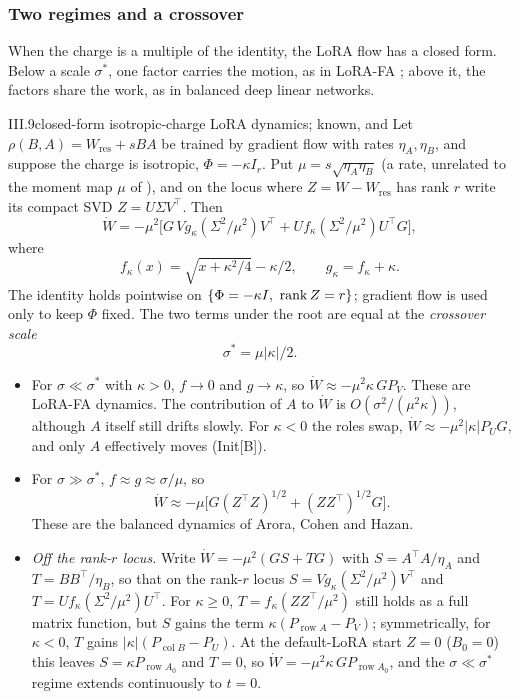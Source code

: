 
\subsubsection{Two regimes and a crossover}\label{sec:fibres-crossover}

When the charge is a multiple of the identity, the LoRA flow has a closed form. Below a scale $\sigma^*$, one factor
carries the motion, as in LoRA-FA \citep{zhang2023lora}; above it, the factors share the work, as in balanced deep
linear networks.

\begin{theorem}{III.9}{closed-form isotropic-charge LoRA dynamics; known, \citet{xtarmoun2021understanding} and \citet{xmin2021explicit}}
Let $\rho(B,A)=W_{\mathrm{res}}+sBA$ be trained by gradient flow with rates $\eta_A,\eta_B$, and suppose the charge is
isotropic, $\Phi=-\kappa I_r$. Put $\mu=s\sqrt{\eta_A\eta_B}$ (a rate, unrelated to the moment map $\mu$ of
), and on the locus where $Z=W-W_{\mathrm{res}}$ has rank $r$ write its compact SVD
$Z=U\Sigma V^\top$. Then
\[\dot W=-\mu^2\big[G\,V g_\kappa(\Sigma^2/\mu^2)V^\top+U f_\kappa(\Sigma^2/\mu^2)U^\top G\big],\]
where
\[f_\kappa(x)=\sqrt{x+\kappa^2/4}-\kappa/2,\qquad g_\kappa=f_\kappa+\kappa .\]
The identity holds pointwise on $\{\Phi=-\kappa I,\ \operatorname{rank} Z=r\}$; gradient flow is used only to keep $\Phi$ fixed. The
two terms under the root are equal at the \emph{crossover scale}
\[\sigma^*=\mu\lvert\kappa\rvert/2.\]
\begin{itemize}
\item For $\sigma\ll\sigma^*$ with $\kappa>0$, $f\to0$ and $g\to\kappa$, so $\dot W\approx-\mu^2\kappa\,GP_V$. These
  are LoRA-FA dynamics. The contribution of $A$ to $\dot W$ is $O(\sigma^2/(\mu^2\kappa))$, although $A$ itself still
  drifts slowly. For $\kappa<0$ the roles swap, $\dot W\approx-\mu^2\lvert\kappa\rvert P_UG$, and only $A$ effectively
  moves (Init[B]).
\item For $\sigma\gg\sigma^*$, $f\approx g\approx\sigma/\mu$, so
  \[\dot W\approx-\mu\big[G(Z^\top Z)^{1/2}+(ZZ^\top)^{1/2}G\big].\]
  These are the balanced dynamics of Arora, Cohen and Hazan.
\item \emph{Off the rank-$r$ locus.} Write $\dot W=-\mu^2(GS+TG)$ with $S=A^\top A/\eta_A$ and $T=BB^\top/\eta_B$, so
  that on the rank-$r$ locus $S=Vg_\kappa(\Sigma^2/\mu^2)V^\top$ and $T=Uf_\kappa(\Sigma^2/\mu^2)U^\top$. For
  $\kappa\ge0$, $T=f_\kappa(ZZ^\top/\mu^2)$ still holds as a full matrix function, but $S$ gains the term
  $\kappa(P_{\operatorname{row}A}-P_V)$; symmetrically, for $\kappa<0$, $T$ gains
  $\lvert\kappa\rvert(P_{\operatorname{col}B}-P_U)$. At the default-LoRA start $Z=0$ ($B_0=0$) this leaves
  $S=\kappa P_{\operatorname{row}A_0}$ and $T=0$, so $\dot W=-\mu^2\kappa\,GP_{\operatorname{row}A_0}$, and the
  $\sigma\ll\sigma^*$ regime extends continuously to $t=0$.
\end{itemize}
\end{theorem}

